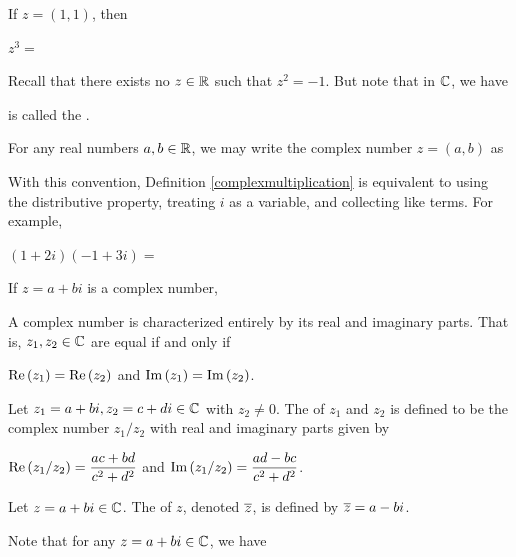 \documentclass[11pt,fleqn,dvipsnames,usenames]{article}
\newcommand{\blank}[1]{\underline{\hspace{#1}}}
\newcommand{\p}{\noindent}
\begin{document}
\begin{example}
If $z = (1,1)$, then
\vsp

$z^3 =$
\vsp

\end{example}
%
\observation Recall that there exists no $z\in\mathbb{R}$ such that $z^2 = -1$.  But note that in $\mathbb{C}$, we have
\vspace{2cm}

\terminology \blank{3cm} is called the .
\vsp

\notation For any real numbers $a,b\in\mathbb{R}$, we may write the complex number $z = (a,b)$ as
\vspace{2cm}

\p With this convention, Definition \ref{complexmultiplication} is equivalent to using the distributive property, treating $i$ as a variable, and collecting like terms.  For example,
\vsp

$(1 + 2i)(-1 + 3i) =$
\vsp

\begin{definition}
If $z = a + bi$ is a complex number,
\vfill

\end{definition}

\note A complex number is characterized entirely by its real and imaginary parts.  That is, $z_{1},z_{2}\in\mathbb{C}$ are equal if and only if
\begin{center}
$\text{Re}\left(z_{1}\right) = \text{Re}\left(z_{2}\right)$ and $\text{Im}\left(z_{1}\right) = \text{Im}\left(z_{2}\right)$.
\end{center}
\newpage

%
\begin{definition}
Let $z_{1} = a+bi,z_{2} = c+di\in\mathbb{C}$ with $z_{2}\neq 0$.  The  of $z_{1}$ and $z_{2}$ is defined to be the complex number $z_{1}/z_{2}$ with real and imaginary parts given by
\begin{center}
$\text{Re}\left(z_{1}/z_{2}\right) = \dfrac{ac + bd}{c^2 + d^2}$ and $\text{Im}\left(z_{1}/z_{2}\right) = \dfrac{ad - bc}{c^2 + d^2}$.
\end{center}
\end{definition}
\vsmsp

\GRAYLINE
%

\begin{definition}
Let $z = a + bi\in\mathbb{C}$.  The  of $z$, denoted $\overline{z}$, is defined by $\overline{z} = a - bi$.
\end{definition}
\vsp

\p Note that for any $z = a + bi\in\mathbb{C}$, we have
\vspace{2cm}
\end{document}
